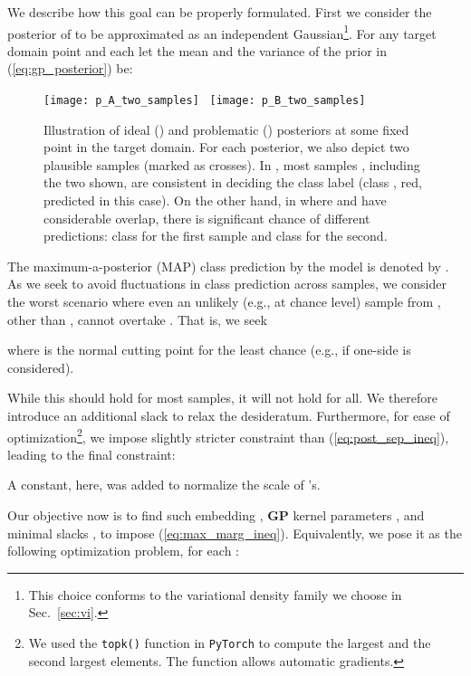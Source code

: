 \documentclass[10pt,letterpaper]{article}
\begin{document}
We describe how this goal can be properly formulated. First we consider the posterior of  to be approximated as an independent Gaussian\footnote{This choice conforms to the variational density family we choose in Sec.~\ref{sec:vi}.}. For any target domain point  and each  let the mean and the variance of the  prior in (\ref{eq:gp_posterior}) be: 



\begin{figure}[t]
\begin{center}
\texttt{[image: p\_A\_two\_samples]} \ \texttt{[image: p\_B\_two\_samples]}
\caption{Illustration of ideal () and problematic ()  posteriors at some fixed point  in the target domain. For each posterior, we also depict two plausible samples (marked as crosses). In , most samples , including the two shown, are consistent in deciding the class label (class , red, predicted in this case). On the other hand, in  where  and  have considerable overlap, there is significant chance of different predictions: class  for the first sample and class  for the second.}
\label{fig:illustrate}
\end{center}
\vspace{-1.2em}
\end{figure}


The maximum-a-posterior (MAP) class prediction by the model is denoted by . As we seek to avoid fluctuations in class prediction  across samples, we consider the worst scenario where even an  unlikely (e.g., at  chance level) sample from ,  other than , cannot overtake . That is, we seek
\vspace{+0.5em}

where  is the normal cutting point for the least chance (e.g.,  if  one-side is considered). 

While this should hold for most samples, it will not hold for all. We therefore introduce an additional slack  to relax the desideratum. Furthermore, for ease of  optimization\footnote{We used the \texttt{topk()} function in \texttt{PyTorch} to compute the largest and the second largest elements. The function allows automatic gradients.}, we impose slightly stricter constraint than (\ref{eq:post_sep_ineq}), leading to the final constraint:

A constant,  here, was added to normalize the scale of 's.

Our objective now is to find such embedding , \textbf {GP} kernel parameters , and minimal slacks , to impose (\ref{eq:max_marg_ineq}). Equivalently, we pose it as the following optimization problem, for each :
\end{document}
